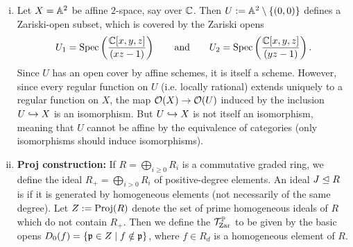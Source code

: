 \begin{eg}
	\label{eg:abstract_schemes_and_Proj}
	\begin{enumerate}[(i)]
		\item Let $X = \mathbb{A}^2$ be affine $2$-space, say over $\mathbb{C}$. Then $U := \mathbb{A}^2\setminus\{(0,0)\}$ defines a Zariski-open subset, which is covered by the Zariski opens 
			\[
				U_1 = \mathrm{Spec}\left(\frac{\mathbb{C}[x,y,z]}{(xz-1)}\right) \qquad \text{and} \qquad U_2 = \mathrm{Spec}\left(\frac{\mathbb{C}[x,y,z]}{(yz-1)}\right).
			\]
			Since $U$ has an open cover by affine schemes, it is itself a scheme. However, since every regular function on $U$ (i.e. locally rational) extends uniquely to a regular function on $X$, the map $\mathcal{O}(X) \to \mathcal{O}(U)$ induced by the inclusion $U \hookrightarrow X$ is an isomorphism. But $U \hookrightarrow X$ is not itself an isomorphism, meaning that $U$ cannot be affine by the equivalence of categories (only isomorphisms should induce isomorphisms).
		\item \textbf{Proj construction:} If $R = \bigoplus_{i \geq 0} R_i$ is a commutative graded ring, we define the ideal $R_+ = \bigoplus_{i>0} R_i$ of positive-degree elements. An ideal $J \trianglelefteq R$ is  if it is generated by homogeneous elements (not necessarily of the same degree). Let $Z := \mathrm{Proj}(R)$ denote the set of prime homogeneous ideals of $R$ which do not contain $R_+$. Then we define the  $\mathcal{T}_\text{Zar}^{\mathbb{P}}$ to be given by the basic opens $D_0(f) = \{\mathfrak{p} \in Z \mid f \notin \mathfrak{p}\}$, where $f \in R_d$ is a homogeneous element of $R$.\\ 


\end{enumerate}
\end{eg}
